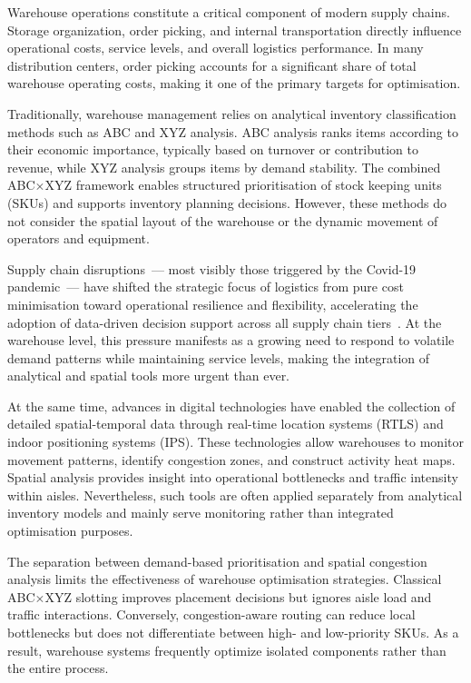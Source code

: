 \documentclass[12pt,a4paper]{article}
\begin{document}
Warehouse operations constitute a critical component of modern supply chains. Storage
organization, order picking, and internal transportation directly influence operational costs,
service levels, and overall logistics performance. In many distribution centers, order picking
accounts for a significant share of total warehouse operating costs, making it one of the
primary targets for optimisation.

Traditionally, warehouse management relies on analytical inventory classification methods
such as ABC and XYZ analysis. ABC analysis ranks items according to their economic
importance, typically based on turnover or contribution to revenue, while XYZ analysis groups
items by demand stability. The combined ABC$\times$XYZ framework enables structured
prioritisation of stock keeping units (SKUs) and supports inventory planning decisions.
However, these methods do not consider the spatial layout of the warehouse or the dynamic
movement of operators and equipment.

Supply chain disruptions~--- most visibly those triggered by the Covid-19 pandemic~---
have shifted the strategic focus of logistics from pure cost minimisation toward operational
resilience and flexibility, accelerating the adoption of data-driven decision support across
all supply chain tiers~\cite{ref9}. At the warehouse level, this pressure manifests as a
growing need to respond to volatile demand patterns while maintaining service levels,
making the integration of analytical and spatial tools more urgent than ever.

At the same time, advances in digital technologies have enabled the collection of detailed
spatial-temporal data through real-time location systems (RTLS) and indoor positioning
systems (IPS). These technologies allow warehouses to monitor movement patterns, identify
congestion zones, and construct activity heat maps. Spatial analysis provides insight into
operational bottlenecks and traffic intensity within aisles. Nevertheless, such tools are often
applied separately from analytical inventory models and mainly serve monitoring rather than
integrated optimisation purposes.

The separation between demand-based prioritisation and spatial congestion analysis limits
the effectiveness of warehouse optimisation strategies. Classical ABC$\times$XYZ slotting
improves placement decisions but ignores aisle load and traffic interactions. Conversely,
congestion-aware routing can reduce local bottlenecks but does not differentiate between
high- and low-priority SKUs. As a result, warehouse systems frequently optimize isolated
components rather than the entire process.
\end{document}
